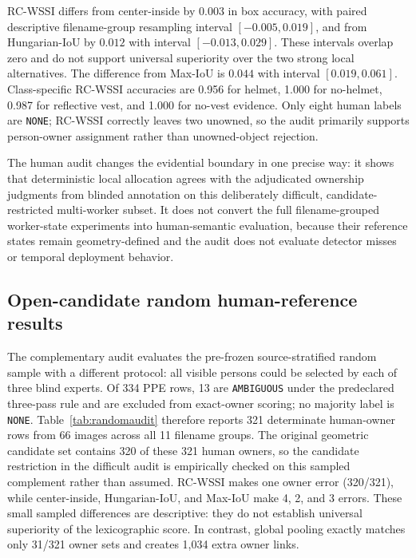 \documentclass[iicol,pdflatex,sn-mathphys-num]{sn-jnl}
\begin{document}
RC-WSSI differs from center-inside by $0.003$ in box accuracy, with paired descriptive filename-group resampling interval $[-0.005,0.019]$, and from Hungarian-IoU by $0.012$ with interval $[-0.013,0.029]$. These intervals overlap zero and do not support universal superiority over the two strong local alternatives. The difference from Max-IoU is $0.044$ with interval $[0.019,0.061]$. Class-specific RC-WSSI accuracies are 0.956 for helmet, 1.000 for no-helmet, 0.987 for reflective vest, and 1.000 for no-vest evidence. Only eight human labels are \texttt{NONE}; RC-WSSI correctly leaves two unowned, so the audit primarily supports person-owner assignment rather than unowned-object rejection.

The human audit changes the evidential boundary in one precise way: it shows that deterministic local allocation agrees with the adjudicated ownership judgments from blinded annotation on this deliberately difficult, candidate-restricted multi-worker subset. It does not convert the full filename-grouped worker-state experiments into human-semantic evaluation, because their reference states remain geometry-defined and the audit does not evaluate detector misses or temporal deployment behavior.

\subsection{Open-candidate random human-reference results}

The complementary audit evaluates the pre-frozen source-stratified random sample with a different protocol: all visible persons could be selected by each of three blind experts. Of 334 PPE rows, 13 are \texttt{AMBIGUOUS} under the predeclared three-pass rule and are excluded from exact-owner scoring; no majority label is \texttt{NONE}. Table~\ref{tab:randomaudit} therefore reports 321 determinate human-owner rows from 66 images across all 11 filename groups. The original geometric candidate set contains 320 of these 321 human owners, so the candidate restriction in the difficult audit is empirically checked on this sampled complement rather than assumed. RC-WSSI makes one owner error (320/321), while center-inside, Hungarian-IoU, and Max-IoU make 4, 2, and 3 errors. These small sampled differences are descriptive: they do not establish universal superiority of the lexicographic score. In contrast, global pooling exactly matches only 31/321 owner sets and creates 1,034 extra owner links.
\end{document}
